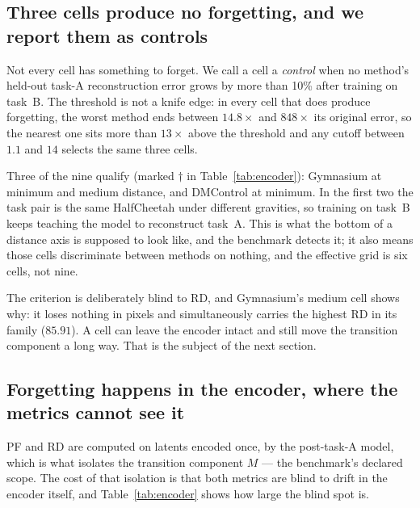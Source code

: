 \subsection{Three cells produce no forgetting, and we report them as controls}
\label{sec:results:controls}

Not every cell has something to forget. We call a cell a \emph{control} when no
method's held-out task-A reconstruction error grows by more than 10\% after
training on task~B. The threshold is not a knife edge: in every cell that does
produce forgetting, the worst method ends between $14.8\times$ and $848\times$ its
original error, so the nearest one sits more than $13\times$ above the threshold
and any cutoff between $1.1$ and $14$ selects the same three cells.

Three of the nine qualify (marked $\dagger$ in Table~\ref{tab:encoder}):
Gymnasium at minimum and medium distance, and DMControl at minimum. In the first
two the task pair is the same HalfCheetah under different gravities, so training
on task~B keeps teaching the model to reconstruct task~A. This is what the bottom
of a distance axis is supposed to look like, and the benchmark detects it; it
also means those cells discriminate between methods on nothing, and the effective
grid is six cells, not nine.

The criterion is deliberately blind to RD, and Gymnasium's medium cell shows
why: it loses nothing in pixels and simultaneously carries the highest RD in its
family ($85.91$). A cell can leave the encoder intact and still move the
transition component a long way. That is the subject of the next section.

\subsection{Forgetting happens in the encoder, where the metrics cannot see it}
\label{sec:results:encoder}

\begin{table}[t]
  \centering
  
  \caption{Held-out task-A reconstruction error after training on task~B, as a
  factor of the same model's error before it. $1.00$ means nothing was lost,
  $811$ means the error grew by a factor of 811. $\dagger$ marks control cells
  (Section~\ref{sec:results:controls}).}
  \label{tab:encoder}
\end{table}

PF and RD are computed on latents encoded once, by the post-task-A model, which
is what isolates the transition component $M$ --- the benchmark's declared
scope. The cost of that isolation is that both metrics are blind to drift in the
encoder itself, and Table~\ref{tab:encoder} shows how large the blind spot is.

